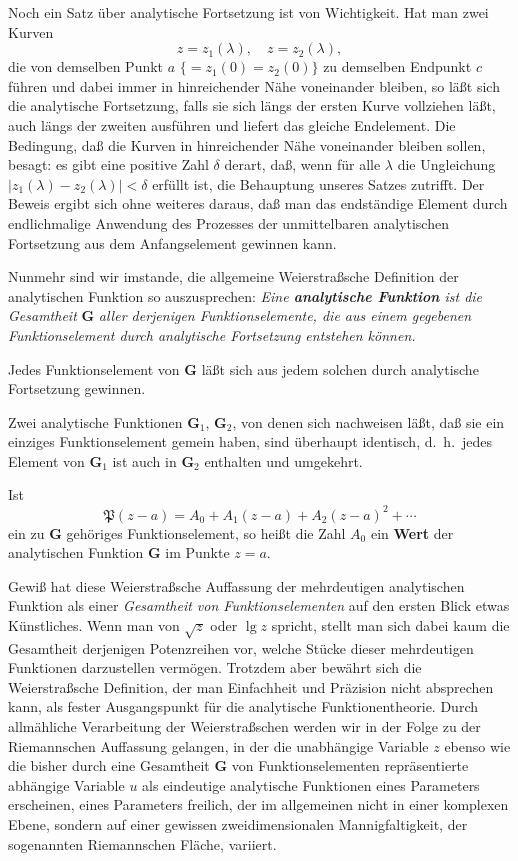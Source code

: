 \documentclass{article}
\begin{document}
Noch ein Satz über analytische Fortsetzung ist von Wichtigkeit. Hat man zwei Kurven
\[ z = z_1(\lambda), \quad z = z_2(\lambda), \]
die von demselben Punkt $a$ $\{ = z_1(0) = z_2(0) \}$ zu demselben Endpunkt $c$ führen und dabei immer in hinreichender Nähe voneinander bleiben, so läßt sich die analytische Fortsetzung, falls sie sich längs der ersten Kurve vollziehen läßt, auch längs der zweiten ausführen und liefert das gleiche Endelement. Die Bedingung, daß die Kurven in hinreichender Nähe voneinander bleiben sollen, besagt: es gibt eine positive Zahl $\delta$ derart, daß, wenn für alle $\lambda$ die Ungleichung $|z_1(\lambda) - z_2(\lambda)| < \delta$ erfüllt ist, die Behauptung unseres Satzes zutrifft. Der Beweis ergibt sich ohne weiteres daraus, daß man das endständige Element durch endlichmalige Anwendung des Prozesses der unmittelbaren analytischen Fortsetzung aus dem Anfangselement gewinnen kann.

Nunmehr sind wir imstande, die allgemeine Weierstraßsche Definition der analytischen Funktion so auszusprechen: \emph{Eine \textbf{analytische Funktion} ist die Gesamtheit} $\mathbf{G}$ \emph{aller derjenigen Funktionselemente, die aus einem gegebenen Funktionselement durch analytische Fortsetzung entstehen können.}

Jedes Funktionselement von $\mathbf{G}$ läßt sich aus jedem solchen durch analytische Fortsetzung gewinnen.

Zwei analytische Funktionen $\mathbf{G}_1$, $\mathbf{G}_2$, von denen sich nachweisen läßt, daß sie ein einziges Funktionselement gemein haben, sind überhaupt identisch, d.\ h.\ jedes Element von $\mathbf{G}_1$ ist auch in $\mathbf{G}_2$ enthalten und umgekehrt.

Ist
\[ \mathfrak{P}(z - a) = A_0 + A_1(z - a) + A_2(z - a)^2 + \cdots \]
ein zu $\mathbf{G}$ gehöriges Funktionselement, so heißt die Zahl $A_0$ ein \textbf{Wert} der analytischen Funktion $\mathbf{G}$ im Punkte $z = a$.

Gewiß hat diese Weierstraßsche Auffassung der mehrdeutigen analytischen Funktion als einer \emph{Gesamtheit von Funktionselementen} auf den ersten Blick etwas Künstliches. Wenn man von $\sqrt{z}$ oder $\lg z$ spricht, stellt man sich dabei kaum die Gesamtheit derjenigen Potenzreihen vor, welche Stücke dieser mehrdeutigen Funktionen darzustellen vermögen. Trotzdem aber bewährt sich die Weierstraßsche Definition, der man Einfachheit und Präzision nicht absprechen kann, als fester Ausgangspunkt für die analytische Funktionentheorie. Durch allmähliche Verarbeitung der Weierstraßschen werden wir in der Folge zu der Riemannschen Auffassung gelangen, in der die unabhängige Variable $z$ ebenso wie die bisher durch eine Gesamtheit $\mathbf{G}$ von Funktionselementen repräsentierte abhängige Variable $u$ als eindeutige analytische Funktionen eines Parameters erscheinen, eines Parameters freilich, der im allgemeinen nicht in einer komplexen Ebene, sondern auf einer gewissen zweidimensionalen Mannigfaltigkeit, der sogenannten Riemannschen Fläche, variiert.
\end{document}
